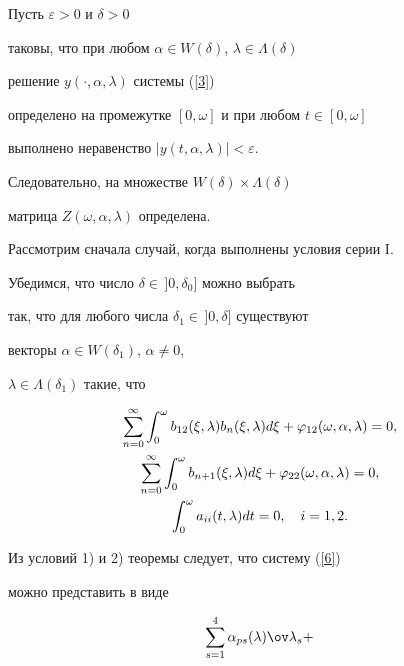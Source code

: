 \begin{pf}


Пусть $\varepsilon >0$ и $\delta >0$


таковы, что при любом $\alpha \in W(\delta)$, $\lambda \in \Lambda (\delta)$


решение $y(\cdot,\alpha,\lambda)$ системы (\ref{3})


определено на промежутке $[0,\omega]$ и при любом $t \in [0,\omega]$


выполнено неравенство $|y(t,\alpha,\lambda)| < \varepsilon$.


Следовательно, на множестве $W(\delta) \times \Lambda (\delta)$


матрица $Z(\omega,\alpha,\lambda)$ определена.





Рассмотрим сначала случай, когда выполнены условия серии I.


Убедимся, что число $\delta \in\,]0,\delta_0]$ можно выбрать


так, что для любого числа $\delta_1 \in\,]0,\delta]$ существуют


векторы $\alpha \in W(\delta_1)$, $\alpha \ne 0$,


$\lambda \in \Lambda (\delta_1)$ такие, что


\begin{gather}


\sum_{n=0}^\infty \int_0^\omega b_{12} (\xi,\lambda)


b_n (\xi,\lambda)d\xi+\varphi_{12} (\omega,\alpha,\lambda)=0,\notag \\


\label{6}


\sum_{n=0}^\infty \int_0^\omega b_{n+1} (\xi,\lambda)d\xi


+\varphi_{22} (\omega,\alpha,\lambda)=0,\\


\int_0^\omega a_{ii} (t,\lambda)dt =0,\quad i=1,2. \notag


\end{gather}





Из условий 1) и 2) теоремы следует, что систему (\ref{6})


можно представить в виде


\begin{equation}


\label{7}


\sum_{s=1}^4 {\alpha_{ps} (\lambda)} \ov \lambda_s+



\end{equation}
\end{pf}
